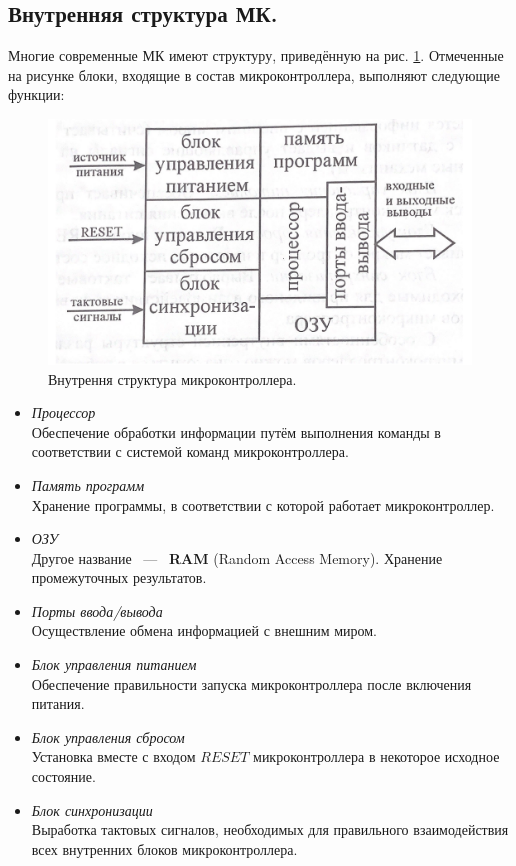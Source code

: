 \subsection{Внутренняя структура МК.}
Многие современные МК имеют структуру, приведённую на рис. \ref{img::1_2_1}.
Отмеченные на рисунке блоки, входящие в состав микроконтроллера,
выполняют следующие функции:
\begin{figure}[h]
  \includegraphics[width=\linewidth]{./src/pics/1.2.1.png}
  \caption{Внутрення структура микроконтроллера.}
  \label{img::1_2_1}
\end{figure}

\begin{itemize}
  \item \textit{Процессор}\\
  Обеспечение обработки информации путём выполнения команды в соответствии 
  с системой команд микроконтроллера.
  \item \textit{Память программ}\\
  Хранение программы, в соответствии с которой работает микроконтроллер.
  \item \textit{ОЗУ}\\
  Другое название ~---~ \textbf{RAM} (Random Access Memory).
  Хранение промежуточных результатов.
  \item \textit{Порты ввода/вывода}\\
  Осуществление обмена информацией с внешним миром.
  \item \textit{Блок управления питанием}\\
  Обеспечение правильности запуска микроконтроллера
  после включения питания.
  \item \textit{Блок управления сбросом}\\
  Установка вместе с входом $RESET$ микроконтроллера в 
  некоторое исходное состояние.
  \item \textit{Блок синхронизации}\\
  Выработка тактовых сигналов, необходимых для правильного взаимодействия 
  всех внутренних блоков микроконтроллера.
\end{itemize}

